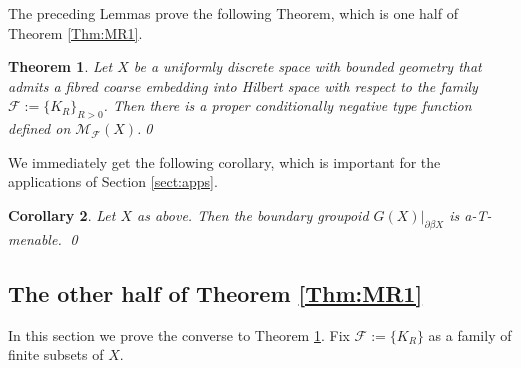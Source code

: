 \documentclass[preprint]{elsarticle}
\theoremstyle{plain}
\newtheorem{theorem}{Theorem}%
\newtheorem{corollary}[theorem]{Corollary}%
\theoremstyle{definition}%
\theoremstyle{remark}%
\begin{document}
The preceding Lemmas prove the following Theorem, which is one half of Theorem \ref{Thm:MR1}.

\begin{theorem}\label{Thm:MT2}
Let $X$ be a uniformly discrete space with bounded geometry that admits a fibred coarse embedding into Hilbert space with respect to the family $\mathcal{F}:=\lbrace K_{R} \rbrace_{R>0}$. Then there is a proper conditionally negative type function defined on $\mathcal{M}_{\mathcal{F}}(X)$.\qed
\end{theorem}

We immediately get the following corollary, which is important for the applications of Section \ref{sect:apps}.

\begin{corollary}\label{thm:MT1-a}
Let $X$ as above. Then the boundary groupoid $G(X)|_{\partial\beta X}$ is a-T-menable. \qed
\end{corollary}

\subsection{The other half of Theorem \ref{Thm:MR1}}

In this section we prove the converse to Theorem \ref{Thm:MT2}. Fix $\mathcal{F}:=\lbrace K_{R} \rbrace$ as a family of finite subsets of $X$.
\end{document}
